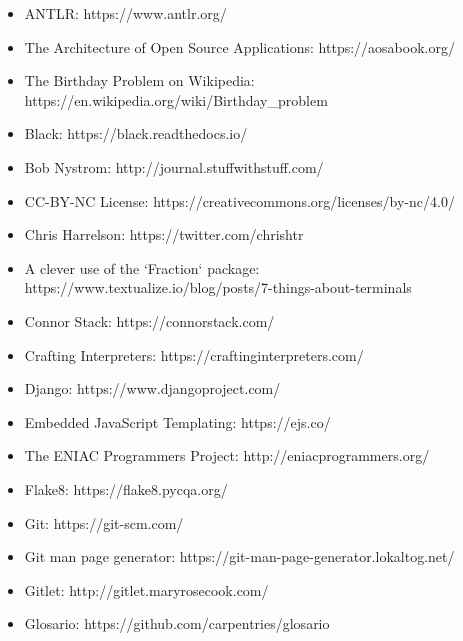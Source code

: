 \documentclass{scrbook}
\begin{document}
\begin{itemize}

\item ANTLR: https://www.antlr.org/

\item The Architecture of Open Source Applications: https://aosabook.org/

\item The Birthday Problem on Wikipedia: https://en.wikipedia.org/wiki/Birthday\_problem

\item Black: https://black.readthedocs.io/

\item Bob Nystrom: http://journal.stuffwithstuff.com/

\item CC-BY-NC License: https://creativecommons.org/licenses/by-nc/4.0/

\item Chris Harrelson: https://twitter.com/chrishtr

\item A clever use of the `Fraction` package: https://www.textualize.io/blog/posts/7-things-about-terminals

\item Connor Stack: https://connorstack.com/

\item Crafting Interpreters: https://craftinginterpreters.com/

\item Django: https://www.djangoproject.com/

\item Embedded JavaScript Templating: https://ejs.co/

\item The ENIAC Programmers Project: http://eniacprogrammers.org/

\item Flake8: https://flake8.pycqa.org/

\item Git: https://git-scm.com/

\item Git man page generator: https://git-man-page-generator.lokaltog.net/

\item Gitlet: http://gitlet.maryrosecook.com/

\item Glosario: https://github.com/carpentries/glosario


\end{itemize}
\end{document}
